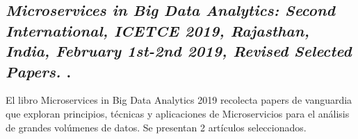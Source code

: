 
\subsection{
    \textbf{\emph{Microservices in Big Data Analytics: Second International, {ICETCE} 2019, Rajasthan, India, February 1st-2nd 2019, Revised Selected Papers.}
    }
    \cite{chaudhary_microservices_2020}.
}

El libro Microservices in Big Data Analytics 2019 recolecta papers de vanguardia que exploran principios, técnicas y aplicaciones de Microservicios para el análisis de grandes volúmenes de datos.
Se presentan 2 artículos seleccionados.\par



